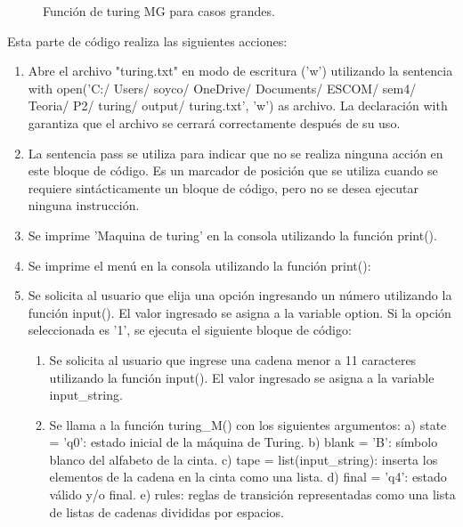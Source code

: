 \begin{figure}[h]
\begin{center}
\end{center}
\caption{Función de turing MG para casos grandes.}
\label{fig:imagen}
\end{figure}
Esta parte de código realiza las siguientes acciones:\newline
\begin{enumerate}
    \item Abre el archivo "turing.txt" en modo de escritura ('w') utilizando la sentencia with open('C:/ Users/ soyco/ OneDrive/ Documents/ ESCOM/ sem4/ Teoria/ P2/ turing/ output/ turing.txt', 'w') as archivo. La declaración with garantiza que el archivo se cerrará correctamente después de su uso.\newline
    \item La sentencia pass se utiliza para indicar que no se realiza ninguna acción en este bloque de código. Es un marcador de posición que se utiliza cuando se requiere sintácticamente un bloque de código, pero no se desea ejecutar ninguna instrucción.\newline
    \item Se imprime 'Maquina de turing' en la consola utilizando la función print().\newline
    \item Se imprime el menú en la consola utilizando la función print():\newline
    \item Se solicita al usuario que elija una opción ingresando un número utilizando la función input(). El valor ingresado se asigna a la variable option.\newline
    Si la opción seleccionada es '1', se ejecuta el siguiente bloque de código:\newline
    \begin{enumerate}
        \item Se solicita al usuario que ingrese una cadena menor a 11 caracteres utilizando la función input(). El valor ingresado se asigna a la variable input\_string.\newline
        \item Se llama a la función turing\_M() con los siguientes argumentos: a) state = 'q0': estado inicial de la máquina de Turing. b) blank = 'B': símbolo blanco del alfabeto de la cinta. c) tape = list(input\_string): inserta los elementos de la cadena en la cinta como una lista. d) final = 'q4': estado válido y/o final. e) rules: reglas de transición representadas como una lista de listas de cadenas divididas por espacios.\newline

\end{enumerate}
\end{enumerate}
